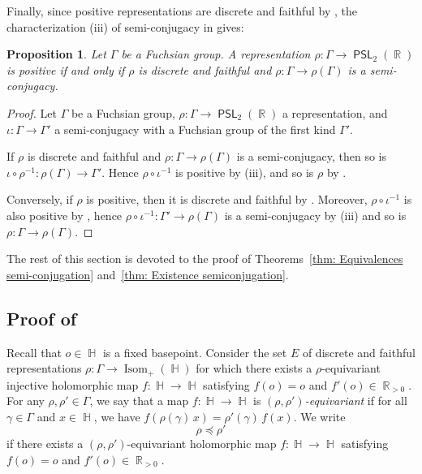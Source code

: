 \documentclass{amsart}
\theoremstyle{plain}
\newtheorem{proposition}{Proposition}[section]
\theoremstyle{definition}
\DeclareMathOperator{\PSL}{\mathsf{PSL}}
\DeclareMathOperator{\Isom}{Isom}
\DeclareMathOperator{\R}{\mathbb{R}}
\DeclareMathOperator{\Hb}{\mathbb{H}}
\DeclareMathOperator{\Rb}{{\mathbb{R}}}
\newcommand{\1}{\mathbf{1}}
\begin{document}
Finally, since positive representations are discrete and faithful by , the characterization (iii) of semi-conjugacy in  gives:

\begin{proposition}
    Let $\Gamma$ be a Fuchsian group. A representation $\rho\colon \Gamma \to \PSL_2(\Rb)$ is positive if and only if $\rho$ is discrete and faithful and $\rho: \Gamma \to \rho(\Gamma)$ is a semi-conjugacy.
\end{proposition}


\begin{proof}
    Let $\Gamma$ be a Fuchsian group, $\rho: \Gamma \to \PSL_2(\Rb)$ a representation, and $\iota: \Gamma \to \Gamma'$ a semi-conjugacy with a Fuchsian group of the first kind $\Gamma'$. 

    If $\rho$ is discrete and faithful and $\rho: \Gamma \to \rho(\Gamma)$ is a semi-conjugacy, then so is $\iota \circ \rho^{-1}: \rho(\Gamma) \to \Gamma'$. Hence $\rho \circ \iota^{-1}$ is positive by  (iii), and so is $\rho$ by .

    Conversely, if $\rho$ is positive, then it is discrete and faithful by . Moreover, $\rho\circ \iota^{-1}$ is also positive by , hence $\rho\circ \iota^{-1}: \Gamma' \to \rho(\Gamma)$ is a semi-conjugacy by  (iii) and so is $\rho: \Gamma \to \rho(\Gamma)$.
\end{proof}

The rest of this section is devoted to the proof of Theorems~\ref{thm: Equivalences semi-conjugation} and~\ref{thm: Existence semiconjugation}.

\subsection{%
\texorpdfstring{%
Proof of }%
{Proof of Theorem A.2}}
    Recall that $o\in \Hb$ is a fixed basepoint. Consider the set $E$ of discrete and faithful representations $\rho\colon\Gamma \to \Isom_+(\Hb)$ for which there exists a $\rho$-equivariant injective holomorphic map $f: \Hb \to \Hb$ satisfying $f(o) = o$ and $f'(o)\in \R_{>0}$. For any $\rho,\rho'\in\Gamma$, we say that a map $f\colon\Hb\to\Hb$ is \emph{$(\rho,\rho')$-equivariant} if for all $\gamma\in\Gamma$ and $x\in\Hb$, we have $f(\rho(\gamma)\,x)=\rho'(\gamma)\,f(x)$. We write
    \[\rho \preceq \rho'\]
    if there exists a $(\rho,\rho')$-equivariant holomorphic map $f: \Hb \to \Hb$ satisfying $f(o) = o$ and $f'(o)\in \R_{>0}$.
\end{document}
